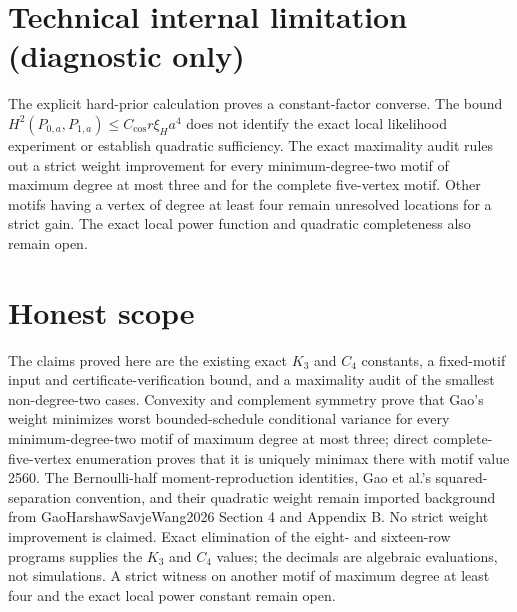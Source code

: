 \documentclass{article}
\begin{document}
\section*{Technical internal limitation (diagnostic only)}

The explicit hard-prior calculation proves a constant-factor converse. The bound \(H^2(P_{0,a},P_{1,a})\le C_{\cos}r\xi_Ha^4\) does not identify the exact local likelihood experiment or establish quadratic sufficiency. The exact maximality audit rules out a strict weight improvement for every minimum-degree-two motif of maximum degree at most three and for the complete five-vertex motif. Other motifs having a vertex of degree at least four remain unresolved locations for a strict gain. The exact local power function and quadratic completeness also remain open.

\section{Honest scope}

The claims proved here are the existing exact \(K_3\) and \(C_4\) constants, a fixed-motif input and certificate-verification bound, and a maximality audit of the smallest non-degree-two cases. Convexity and complement symmetry prove that Gao's weight minimizes worst bounded-schedule conditional variance for every minimum-degree-two motif of maximum degree at most three; direct complete-five-vertex enumeration proves that it is uniquely minimax there with motif value 2560. The Bernoulli-half moment-reproduction identities, Gao et al.'s squared-separation convention, and their quadratic weight remain imported background from GaoHarshawSavjeWang2026 Section 4 and Appendix B. No strict weight improvement is claimed. Exact elimination of the eight- and sixteen-row programs supplies the \(K_3\) and \(C_4\) values; the decimals are algebraic evaluations, not simulations. A strict witness on another motif of maximum degree at least four and the exact local power constant remain open.
\end{document}
